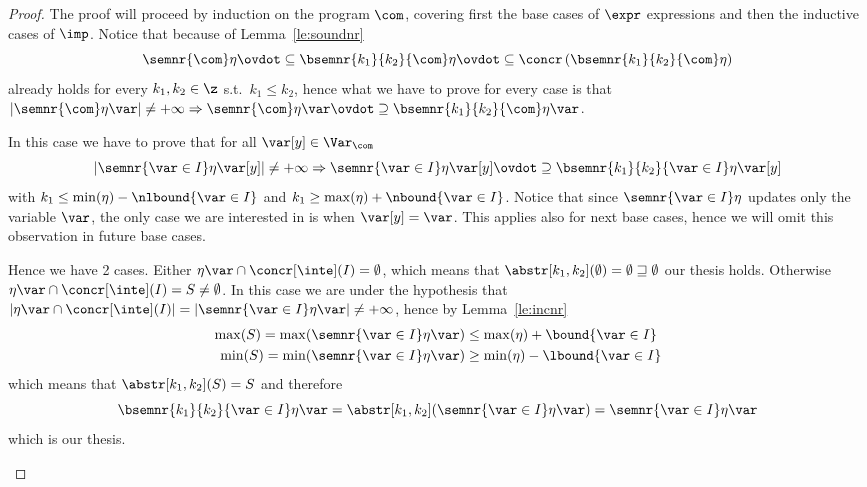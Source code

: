 \begin{proof}
  The proof will proceed by induction on the program \(\com\),
  covering first the base cases of \(\expr\) expressions and then the
  inductive cases of \(\imp\). Notice that because of
  Lemma~\ref{le:soundnr}
  \begin{equation*}
    \semnr{\com} \eta \ovdot\subseteq \bsemnr{k_1}{k_2}{\com}\eta \ovdot\subseteq \concr\left(\bsemnr{k_1}{k_2}{\com}\eta\right)
  \end{equation*}
  already holds for every \(k_1, k_2 \in \z\) s.t.\ \(k_1\leq k_2\),
  hence what we have to prove for every case is that
  \(|\semnr{\com}\eta\var| \neq +\infty \Rightarrow \semnr{\com} \eta
  \var \ovdot\supseteq \bsemnr{k_1}{k_2}{\com}\eta\var\).
  \begin{inductive}
     In this case we have to prove that for all
    \(\var[y] \in \Var_{\com}\)
    \[|\semnr{\var\in I}\eta\var[y]| \neq + \infty \Rightarrow
      \semnr{\var\in I}\eta \var[y] \ovdot\supseteq
      \bsemnr{k_1}{k_2}{\var\in I}\eta\var[y]\] with
    \(k_1\leq \min(\eta) - \nlbound{\var \in I}\) and
    \(k_1\geq \max(\eta) + \nbound{\var \in I}\). Notice that since
    \(\semnr{\var \in I}\eta\) updates only the variable \(\var\), the
    only case we are interested in is when \(\var[y] = \var\). This
    applies also for next base cases, hence we will omit this
    observation in future base cases.

    \medskip

    \noindent
    Hence we have 2 cases. Either
    \(\eta\var \cap \concr[\inte](I) = \emptyset\), which means that
    \(\abstr[k_1,k_2]({\emptyset}) = \emptyset \sqsupseteq \emptyset\)
    our thesis holds. Otherwise
    \(\eta\var \cap \concr[\inte](I) = S \neq \emptyset\). In this
    case we are under the hypothesis that
    \(|\eta\var\cap\concr[\inte](I)| = |\semnr{\var\in I}\eta\var|
    \neq +\infty\), hence by Lemma~\ref{le:incnr}
    \begin{align*}
      \max(S) = \max(\semnr{\var\in I}\eta\var) & \leq \max(\eta) + \bound{\var \in I}\\
      \min(S) = \min(\semnr{\var\in I}\eta\var) & \geq \min(\eta) - \lbound{\var \in I}
    \end{align*}
    which means that \(\abstr[k_1,k_2](S) = S\) and therefore
    \begin{equation*}
      \bsemnr{k_1}{k_2}{\var\in I}\eta\var = \abstr[k_1,k_2](\semnr{\var\in I}\eta\var) = \semnr{\var\in I}\eta\var
    \end{equation*}
    which is our thesis.


\end{inductive}
\end{proof}
